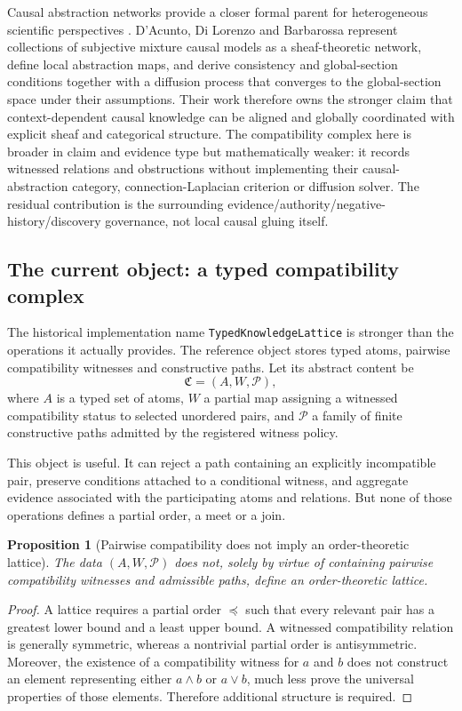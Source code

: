 \documentclass[11pt]{article}
\newtheorem{proposition}{Proposition}
\begin{document}
Causal abstraction networks provide a closer formal parent for heterogeneous scientific perspectives \cite{dacunto2026can}. D'Acunto, Di Lorenzo and Barbarossa represent collections of subjective mixture causal models as a sheaf-theoretic network, define local abstraction maps, and derive consistency and global-section conditions together with a diffusion process that converges to the global-section space under their assumptions. Their work therefore owns the stronger claim that context-dependent causal knowledge can be aligned and globally coordinated with explicit sheaf and categorical structure. The compatibility complex here is broader in claim and evidence type but mathematically weaker: it records witnessed relations and obstructions without implementing their causal-abstraction category, connection-Laplacian criterion or diffusion solver. The residual contribution is the surrounding evidence/authority/negative-history/discovery governance, not local causal gluing itself.

\subsection{The current object: a typed compatibility complex}

The historical implementation name \texttt{TypedKnowledgeLattice} is stronger than the operations it actually provides. The reference object stores typed atoms, pairwise compatibility witnesses and constructive paths. Let its abstract content be
\[
\mathfrak C=(A,W,\mathcal P),
\]
where \(A\) is a typed set of atoms, \(W\) a partial map assigning a witnessed compatibility status to selected unordered pairs, and \(\mathcal P\) a family of finite constructive paths admitted by the registered witness policy.

This object is useful. It can reject a path containing an explicitly incompatible pair, preserve conditions attached to a conditional witness, and aggregate evidence associated with the participating atoms and relations. But none of those operations defines a partial order, a meet or a join.

\begin{proposition}[Pairwise compatibility does not imply an order-theoretic lattice]
The data \((A,W,\mathcal P)\) does not, solely by virtue of containing pairwise compatibility witnesses and admissible paths, define an order-theoretic lattice.
\end{proposition}

\begin{proof}
A lattice requires a partial order \(\preceq\) such that every relevant pair has a greatest lower bound and a least upper bound. A witnessed compatibility relation is generally symmetric, whereas a nontrivial partial order is antisymmetric. Moreover, the existence of a compatibility witness for \(a\) and \(b\) does not construct an element representing either \(a\wedge b\) or \(a\vee b\), much less prove the universal properties of those elements. Therefore additional structure is required.
\end{proof}
\end{document}
